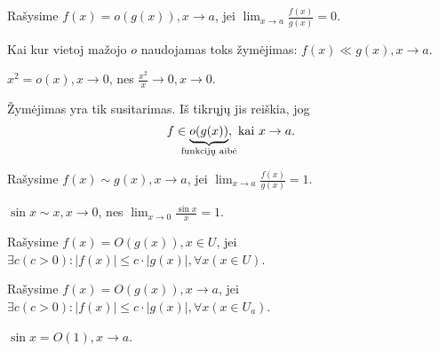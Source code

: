\begin{defn}
  Rašysime $f(x) = o(g(x)), x \to a$, jei 
  $\lim _{x \to a} \frac{f(x)}{g(x)} = 0$.
\end{defn}

\begin{notation}
  Kai kur vietoj mažojo $o$ naudojamas toks žymėjimas: 
  $f(x) \ll g(x), x \to a$.
\end{notation}

\begin{exmp}
  $x^2 = o(x), x \to 0$, nes $\frac{x^2}{x} \to 0, x \to 0$.
\end{exmp}

\begin{note}
  Žymėjimas yra tik susitarimas. Iš tikrųjų jis reiškia, jog
  \begin{equation*}
    f \in \underbrace{o(g(x))}_{\mathclap{\text{funkcijų aibė}}}, 
      \text{ kai } x \to a.
  \end{equation*}
\end{note}

\begin{defn}
  Rašysime $f(x) \sim g(x), x \to a$, jei 
  $\lim _{x \to a} \frac{f(x)}{g(x)} = 1$.
\end{defn}

\begin{exmp}
  $\sin x \sim x, x \to 0$, nes $\lim _{x \to 0} \frac{\sin x}{x} = 1$.
\end{exmp}

\begin{defn}
  Rašysime $f(x) = O(g(x)), x \in U$, jei 
  $\exists c (c > 0) : |f(x)| \leq c \cdot |g(x)|, \forall x (x \in U)$.
\end{defn}

\begin{defn}
  Rašysime $f(x) = O(g(x)), x \to a$, jei
  $\exists c (c > 0): |f(x)| \leq c \cdot |g(x)|, \forall x (x \in U_{a})$.
\end{defn}

\begin{exmp}
  $\sin x = O(1), x \to a$.
\end{exmp}
